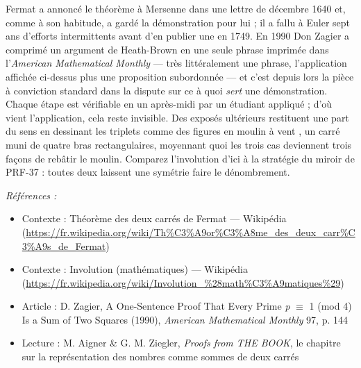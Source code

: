\documentclass[11pt]{article}
\newenvironment{refs}{\par\small\noindent\emph{Références :}\begin{itemize}\setlength\itemsep{0pt}}{\end{itemize}\normalsize}
\begin{document}
\noindent Fermat a annoncé le théorème à Mersenne dans une lettre de décembre 1640
et, comme à son habitude, a gardé la démonstration pour lui ; il a fallu à Euler sept ans
d'efforts intermittents avant d'en publier une en 1749. En 1990 Don Zagier a comprimé un
argument de Heath-Brown en une seule phrase imprimée dans l'\textit{American Mathematical
Monthly} --- très littéralement une phrase, l'application affichée ci-dessus plus une
proposition subordonnée --- et c'est depuis lors la pièce à conviction standard dans la
dispute sur ce à quoi \textit{sert} une démonstration. Chaque étape est vérifiable en un
après-midi par un étudiant appliqué ; d'où vient l'application, cela reste invisible. Des
exposés ultérieurs restituent une part du sens en dessinant les triplets comme des figures
en \og{} moulin à vent \fg{}, un carré muni de quatre bras rectangulaires, moyennant quoi les trois
cas deviennent trois façons de rebâtir le moulin. Comparez l'involution d'ici à la stratégie
du miroir de PRF-37 : toutes deux laissent une symétrie faire le dénombrement.

\begin{refs}
\item Contexte : Théorème des deux carrés de Fermat --- Wikipédia (\url{https://fr.wikipedia.org/wiki/Th%C3%A9or%C3%A8me_des_deux_carr%C3%A9s_de_Fermat})
\item Contexte : Involution (mathématiques) --- Wikipédia (\url{https://fr.wikipedia.org/wiki/Involution_%28math%C3%A9matiques%29})
\item Article : D. Zagier, \og{} A One-Sentence Proof That Every Prime \textit{p} $\equiv$ 1 (mod 4) Is a Sum of Two Squares \fg{} (1990), \textit{American Mathematical Monthly} 97, p. 144
\item Lecture : M. Aigner \& G. M. Ziegler, \textit{Proofs from THE BOOK}, le chapitre sur la représentation des nombres comme sommes de deux carrés
\end{refs}

\bigskip
\end{document}

